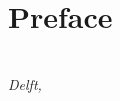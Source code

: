 \chapter*{Preface}



\begin{flushright}
{\makeatletter\itshape
    \@author \\
    Delft, \monthname{} \the\year{}
\makeatother}
\end{flushright}
